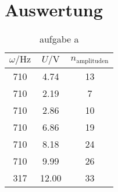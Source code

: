\section{Auswertung}
\label{sec:Auswertung}
\begin{table}
    \centering
    \caption{aufgabe a}
    \label{tab:a}
    \begin{tabular}{c c c}
        \toprule
        {$\omega / \si{\hertz}$} & {$U / \si{\volt}$} & {$n_\text{amplituden}$} \\
        \midrule
        710 &  4.74 & 13 \\
        710 &  2.19 &  7 \\  
        710 &  2.86 & 10 \\
        710 &  6.86 & 19 \\
        710 &  8.18 & 24 \\
        710 &  9.99 & 26 \\
        317 & 12.00 & 33 \\
        \bottomrule
    \end{tabular}
\end{table}
